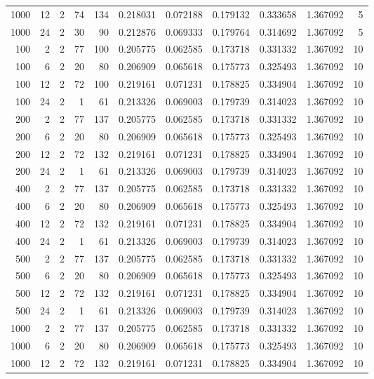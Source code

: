 \begin{table}
\begin{tabular}{rrrrrrrrrrr}
1000 & 12 & 2 & 74 & 134 & 0.218031 & 0.072188 & 0.179132 & 0.333658 & 1.367092 & 5 \\
1000 & 24 & 2 & 30 & 90 & 0.212876 & 0.069333 & 0.179764 & 0.314692 & 1.367092 & 5 \\
100 & 2 & 2 & 77 & 100 & 0.205775 & 0.062585 & 0.173718 & 0.331332 & 1.367092 & 10 \\
100 & 6 & 2 & 20 & 80 & 0.206909 & 0.065618 & 0.175773 & 0.325493 & 1.367092 & 10 \\
100 & 12 & 2 & 72 & 100 & 0.219161 & 0.071231 & 0.178825 & 0.334904 & 1.367092 & 10 \\
100 & 24 & 2 & 1 & 61 & 0.213326 & 0.069003 & 0.179739 & 0.314023 & 1.367092 & 10 \\
200 & 2 & 2 & 77 & 137 & 0.205775 & 0.062585 & 0.173718 & 0.331332 & 1.367092 & 10 \\
200 & 6 & 2 & 20 & 80 & 0.206909 & 0.065618 & 0.175773 & 0.325493 & 1.367092 & 10 \\
200 & 12 & 2 & 72 & 132 & 0.219161 & 0.071231 & 0.178825 & 0.334904 & 1.367092 & 10 \\
200 & 24 & 2 & 1 & 61 & 0.213326 & 0.069003 & 0.179739 & 0.314023 & 1.367092 & 10 \\
400 & 2 & 2 & 77 & 137 & 0.205775 & 0.062585 & 0.173718 & 0.331332 & 1.367092 & 10 \\
400 & 6 & 2 & 20 & 80 & 0.206909 & 0.065618 & 0.175773 & 0.325493 & 1.367092 & 10 \\
400 & 12 & 2 & 72 & 132 & 0.219161 & 0.071231 & 0.178825 & 0.334904 & 1.367092 & 10 \\
400 & 24 & 2 & 1 & 61 & 0.213326 & 0.069003 & 0.179739 & 0.314023 & 1.367092 & 10 \\
500 & 2 & 2 & 77 & 137 & 0.205775 & 0.062585 & 0.173718 & 0.331332 & 1.367092 & 10 \\
500 & 6 & 2 & 20 & 80 & 0.206909 & 0.065618 & 0.175773 & 0.325493 & 1.367092 & 10 \\
500 & 12 & 2 & 72 & 132 & 0.219161 & 0.071231 & 0.178825 & 0.334904 & 1.367092 & 10 \\
500 & 24 & 2 & 1 & 61 & 0.213326 & 0.069003 & 0.179739 & 0.314023 & 1.367092 & 10 \\
1000 & 2 & 2 & 77 & 137 & 0.205775 & 0.062585 & 0.173718 & 0.331332 & 1.367092 & 10 \\
1000 & 6 & 2 & 20 & 80 & 0.206909 & 0.065618 & 0.175773 & 0.325493 & 1.367092 & 10 \\
1000 & 12 & 2 & 72 & 132 & 0.219161 & 0.071231 & 0.178825 & 0.334904 & 1.367092 & 10 \\

\end{tabular}
\end{table}
